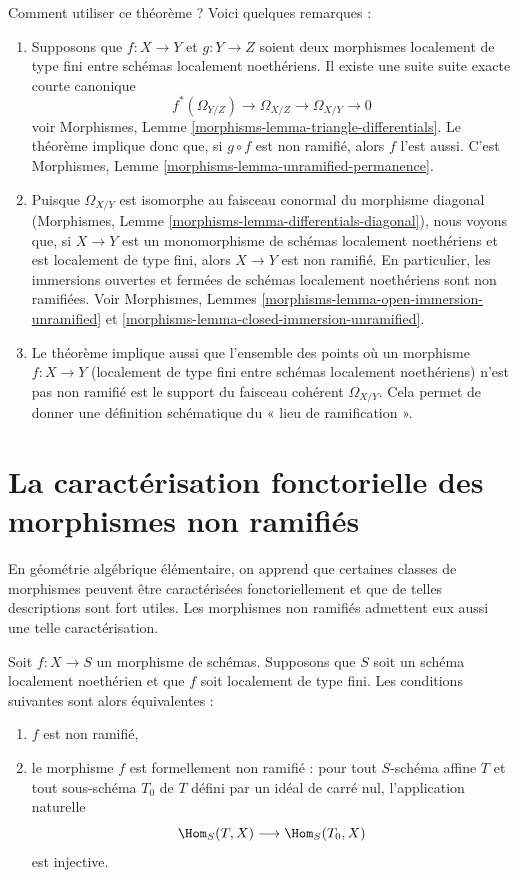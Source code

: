 \noindent
Comment utiliser ce théorème ? Voici quelques remarques :
\begin{enumerate}
\item Supposons que
$f : X \to Y$ et $g : Y \to Z$ soient deux morphismes localement de type
fini entre schémas localement noethériens. Il existe une suite
suite exacte courte canonique
$$
f^*(\Omega_{Y/Z}) \to \Omega_{X/Z} \to \Omega_{X/Y} \to 0
$$
voir Morphismes, Lemme \ref{morphisms-lemma-triangle-differentials}.
Le théorème implique donc que, si $g \circ f$ est non ramifié,
alors $f$ l'est aussi. C'est
Morphismes, Lemme \ref{morphisms-lemma-unramified-permanence}.
\item Puisque $\Omega_{X/Y}$ est isomorphe au faisceau conormal
du morphisme diagonal
(Morphismes, Lemme \ref{morphisms-lemma-differentials-diagonal}),
nous voyons que, si $X \to Y$ est un monomorphisme de
schémas localement noethériens et est localement de type fini,
alors $X \to Y$ est non ramifié.
En particulier, les immersions ouvertes et fermées de schémas localement noethériens
sont non ramifiées. Voir
Morphismes, Lemmes
\ref{morphisms-lemma-open-immersion-unramified} et
\ref{morphisms-lemma-closed-immersion-unramified}.
\item Le théorème implique aussi que l'ensemble des points
où un morphisme $f : X \to Y$ (localement de type fini entre schémas localement
noethériens) n'est pas non ramifié est
le support du faisceau cohérent $\Omega_{X/Y}$.
Cela permet de donner une définition schématique du
« lieu de ramification ».
\end{enumerate}

\section{La caractérisation fonctorielle des morphismes non ramifiés}
\label{section-functorial-unramified}

\noindent
En géométrie algébrique élémentaire, on apprend que certaines classes de morphismes peuvent être
caractérisées fonctoriellement et que de telles descriptions sont fort utiles.
Les morphismes non ramifiés admettent eux aussi une telle caractérisation.

\begin{theorem}
\label{theorem-formally-unramified}
Soit $f : X \to S$ un morphisme de schémas.
Supposons que $S$ soit un schéma localement noethérien et que $f$ soit localement de type fini.
Les conditions suivantes sont alors équivalentes :
\begin{enumerate}
\item $f$ est non ramifié,
\item le morphisme $f$ est formellement non ramifié :
pour tout $S$-schéma affine $T$ et tout sous-schéma $T_0$ de $T$
défini par un idéal de carré nul,
l'application naturelle
$$
\Hom_S(T, X) \longrightarrow \Hom_S(T_0, X)
$$
est injective.
\end{enumerate}
\end{theorem}

